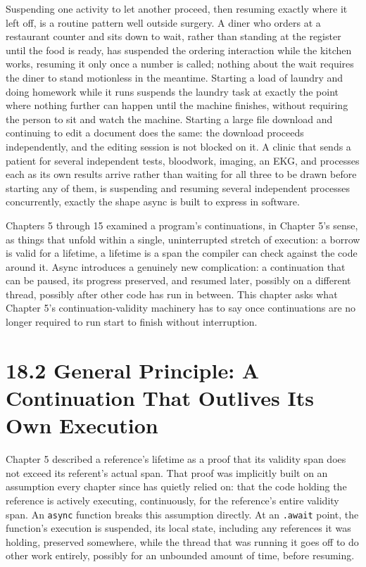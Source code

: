 \documentclass[11pt]{book}
\begin{document}
Suspending one activity to let another proceed, then resuming exactly where it left off, is a routine pattern well outside surgery. A diner who orders at a restaurant counter and sits down to wait, rather than standing at the register until the food is ready, has suspended the ordering interaction while the kitchen works, resuming it only once a number is called; nothing about the wait requires the diner to stand motionless in the meantime. Starting a load of laundry and doing homework while it runs suspends the laundry task at exactly the point where nothing further can happen until the machine finishes, without requiring the person to sit and watch the machine. Starting a large file download and continuing to edit a document does the same: the download proceeds independently, and the editing session is not blocked on it. A clinic that sends a patient for several independent tests, bloodwork, imaging, an EKG, and processes each as its own results arrive rather than waiting for all three to be drawn before starting any of them, is suspending and resuming several independent processes concurrently, exactly the shape async is built to express in software.

Chapters 5 through 15 examined a program's continuations, in Chapter 5's sense, as things that unfold within a single, uninterrupted stretch of execution: a borrow is valid for a lifetime, a lifetime is a span the compiler can check against the code around it. Async introduces a genuinely new complication: a continuation that can be paused, its progress preserved, and resumed later, possibly on a different thread, possibly after other code has run in between. This chapter asks what Chapter 5's continuation-validity machinery has to say once continuations are no longer required to run start to finish without interruption.

\section*{18.2 General Principle: A Continuation That Outlives Its Own Execution}

Chapter 5 described a reference's lifetime as a proof that its validity span does not exceed its referent's actual span. That proof was implicitly built on an assumption every chapter since has quietly relied on: that the code holding the reference is actively executing, continuously, for the reference's entire validity span. An \texttt{async} function breaks this assumption directly. At an \texttt{.await} point, the function's execution is suspended, its local state, including any references it was holding, preserved somewhere, while the thread that was running it goes off to do other work entirely, possibly for an unbounded amount of time, before resuming.
\end{document}
